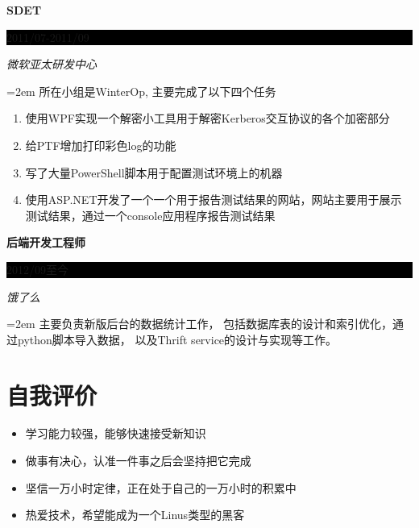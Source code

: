 \documentclass[paper=a4,fontsize=11pt]{scrartcl}	 			%
\newcommand{\sepspace}{\vspace*{1em}}			%
\newcommand{\NewPart}[1]{\section*{\uppercase{#1}}}
\newcommand{\EducationEntry}[4]{
		\noindent \textbf{#1} \hfill 					%
		\colorbox{Black}{%
			\parbox{8em}{%
			\hfill\color{White}#2}} \par				%
		\noindent \textit{#3} \par					%
		\noindent\hangindent=2em\hangafter=0  #4 	%
		\normalsize \par}
\begin{document}
\begin{CJK}{UTF8}{gbsn}
\EducationEntry{SDET}{2011/07-2011/09}{微软亚太研发中心}
{所在小组是WinterOp, 主要完成了以下四个任务
\begin{enumerate}
        \item 使用WPF实现一个解密小工具用于解密Kerberos交互协议的各个加密部分
        \item 给PTF增加打印彩色log的功能
        \item 写了大量PowerShell脚本用于配置测试环境上的机器
        \item 使用ASP.NET开发了一个一个用于报告测试结果的网站，网站主要用于展示测试结果，通过一个console应用程序报告测试结果
\end{enumerate}
}
\sepspace

\EducationEntry{后端开发工程师}{2012/09至今}{饿了么}
{主要负责新版后台的数据统计工作，
包括数据库表的设计和索引优化，通过python脚本导入数据，
以及Thrift service的设计与实现等工作。
}

\NewPart{自我评价}{}
\begin{itemize}
\item 学习能力较强，能够快速接受新知识
\item 做事有决心，认准一件事之后会坚持把它完成
\item 坚信一万小时定律，正在处于自己的一万小时的积累中
\item 热爱技术，希望能成为一个Linus类型的黑客
\end{itemize}
\end{CJK}
\end{document}
